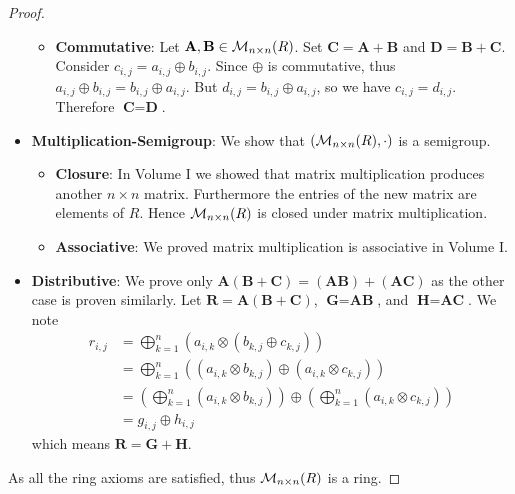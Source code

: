 \begin{proof}
\begin{itemize}
\begin{itemize}
            \item \textbf{Commutative}: Let $\textbf{A}, \textbf{B} \in \mathcal{M}_{n\times n}(R)$. Set $\textbf{C} = \textbf{A} + \textbf{B}$ and $\textbf{D} = \textbf{B} + \textbf{C}$. Consider $c_{i,j} = a_{i,j} \oplus b_{i,j}$. Since $\oplus$ is commutative, thus $a_{i,j} \oplus b_{i,j} = b_{i,j} \oplus a_{i,j}$. But $d_{i,j} = b_{i,j} \oplus a_{i,j}$, so we have $c_{i,j} = d_{i,j}$. Therefore $\textbf{C} = \textbf{D}$.
        \end{itemize}

        \item \textbf{Multiplication-Semigroup}: We show that $(\mathcal{M}_{n\times n}(R), \cdot)$ is a semigroup.
        \begin{itemize}
            \item \textbf{Closure}: In Volume I we showed that matrix multiplication produces another $n \times n$ matrix. Furthermore the entries of the new matrix are elements of $R$. Hence $\mathcal{M}_{n\times n}(R)$ is closed under matrix multiplication.
        
            \item \textbf{Associative}: We proved matrix multiplication is associative in Volume I.
        \end{itemize}
        
        \item \textbf{Distributive}: We prove only $\textbf{A}(\textbf{B} + \textbf{C}) = (\textbf{AB}) + (\textbf{AC})$ as the other case is proven similarly. Let $\textbf{R} = \textbf{A}(\textbf{B} + \textbf{C})$, $\textbf{G} = \textbf{AB}$, and $\textbf{H} = \textbf{AC}$. We note
        \begin{align*}
            r_{i,j} &= \bigoplus_{k=1}^n \left(a_{i,k} \otimes \left(b_{k,j} \oplus c_{k,j}\right)\right)\\
            &= \bigoplus_{k=1}^n \left((a_{i,k} \otimes b_{k,j}) \oplus (a_{i,k} \otimes c_{k,j})\right)\\
            &= \left(\bigoplus_{k=1}^n (a_{i,k} \otimes b_{k,j})\right) \oplus \left(\bigoplus_{k=1}^n (a_{i,k} \otimes c_{k,j})\right)\\
            &= g_{i,j}\oplus h_{i,j}
        \end{align*}
        which means $\textbf{R} = \textbf{G} + \textbf{H}$.
    \end{itemize}
    As all the ring axioms are satisfied, thus $\mathcal{M}_{n\times n}(R)$ is a ring.


\end{proof}

